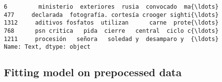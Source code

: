 \documentclass[11pt]{article}
\makeatletter
\newcommand{\boxspacing}{\kern\kvtcb@left@rule\kern\kvtcb@boxsep}
\newcommand{\prompt}[4]{
        {\ttfamily\llap{{\color{#2}[#3]:\hspace{3pt}#4}}\vspace{-\baselineskip}}
    }
\makeatother
\begin{document}
            \begin{tcolorbox}[breakable, size=fbox, boxrule=.5pt, pad at break*=1mm, opacityfill=0]
\prompt{Out}{outcolor}{ }{\boxspacing}
\begin{Verbatim}[commandchars=\\\{\}]
6         ministerio  exteriores  rusia  convocado  ma{\ldots}
477     declarada  fotografía. cortesía crooger sighti{\ldots}
1312     aditivos fosfatos  utilizan      carne  prote{\ldots}
768      psn critica   pida  cierre   central  ciclo c{\ldots}
1211     procesión   señora   soledad y  desamparo y  {\ldots}
Name: Text, dtype: object
\end{Verbatim}
\end{tcolorbox}
        
    \subsection{Fitting model on prepocessed
data}\label{fitting-model-on-prepocessed-data}
\end{document}
